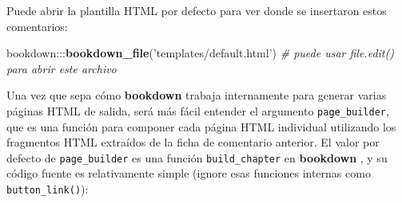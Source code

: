 \documentclass[12pt,]{krantz}
\makeatletter
\newenvironment{Shaded}{\begin{snugshade}}{\end{snugshade}}
\newcommand{\KeywordTok}[1]{\textcolor[rgb]{0.13,0.29,0.53}{\textbf{{#1}}}}
\newcommand{\DataTypeTok}[1]{\textcolor[rgb]{0.13,0.29,0.53}{{#1}}}
\newcommand{\CharTok}[1]{\textcolor[rgb]{0.31,0.60,0.02}{{#1}}}
\newcommand{\StringTok}[1]{\textcolor[rgb]{0.31,0.60,0.02}{{#1}}}
\newcommand{\CommentTok}[1]{\textcolor[rgb]{0.56,0.35,0.01}{\textit{{#1}}}}
\newcommand{\NormalTok}[1]{{#1}}
\newenvironment{kframe}{%
\medskip{}
\setlength{\fboxsep}{.8em}
 \def\at@end@of@kframe{}%
 \ifinner\ifhmode%
  \def\at@end@of@kframe{\end{minipage}}%
  \begin{minipage}{\columnwidth}%
 \fi\fi%
 \def\FrameCommand##1{\hskip\@totalleftmargin \hskip-\fboxsep
 \colorbox{shadecolor}{##1}\hskip-\fboxsep
     \hskip-\linewidth \hskip-\@totalleftmargin \hskip\columnwidth}%
 \MakeFramed {\advance\hsize-\width
   \@totalleftmargin\z@ \linewidth\hsize
   \@setminipage}}%
 {\par\unskip\endMakeFramed%
 \at@end@of@kframe}
\renewenvironment{Shaded}{\begin{kframe}}{\end{kframe}}
\theoremstyle{definition}
\theoremstyle{definition}
\theoremstyle{remark}
\makeatother
\begin{document}
Puede abrir la plantilla HTML por defecto para ver donde se insertaron
estos comentarios:

\begin{Shaded}
\begin{Highlighting}[]
\NormalTok{bookdown:::}\KeywordTok{bookdown_file}\NormalTok{(}\StringTok{'templates/default.html'}\NormalTok{)}
\CommentTok{# puede usar file.edit() para abrir este archivo}
\end{Highlighting}
\end{Shaded}

Una vez que sepa cómo \textbf{bookdown} trabaja internamente para
generar varias páginas HTML de salida, será más fácil entender el
argumento \texttt{page\_builder}, que es una función para componer cada
página HTML individual utilizando los fragmentos HTML extraídos de la
ficha de comentario anterior. El valor por defecto de
\texttt{page\_builder} es una función \texttt{build\_chapter} en
\textbf{bookdown} , y su código fuente es relativamente simple (ignore
esas funciones internas como \texttt{button\_link()}):

\begin{Shaded}
\end{Shaded}
\end{document}
